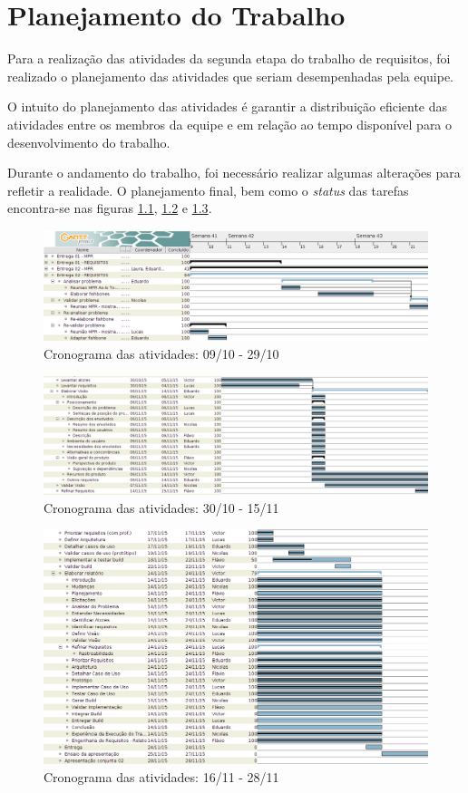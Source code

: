 \chapter{Planejamento do Trabalho}
\label{sec:planejamento}

  Para a realização das atividades da segunda etapa do trabalho de requisitos, foi realizado o planejamento das atividades que seriam desempenhadas pela equipe.

  O intuito do planejamento das atividades é garantir a distribuição eficiente das atividades entre os membros da equipe e em relação ao tempo disponível para o desenvolvimento do trabalho.

  Durante o andamento do trabalho, foi necessário realizar algumas alterações para refletir a realidade. O planejamento final, bem como o \emph{status}  das tarefas encontra-se nas figuras \ref{fig:cronograma1}, \ref{fig:cronograma2} e \ref{fig:cronograma3}.

  \begin{figure}[H]
    \centering
    \includegraphics[width=\textwidth]{figuras/cronograma1}
    \caption{Cronograma das atividades: 09/10 - 29/10}
    \label{fig:cronograma1}
  \end{figure}

  \begin{figure}[H]
    \centering
    \includegraphics[width=\textwidth]{figuras/cronograma2}
    \caption{Cronograma das atividades: 30/10 - 15/11}
    \label{fig:cronograma2}
  \end{figure}

  \begin{figure}[H]
    \centering
    \includegraphics[width=\textwidth]{figuras/cronograma3}
    \caption{Cronograma das atividades: 16/11 - 28/11}
    \label{fig:cronograma3}
  \end{figure}
